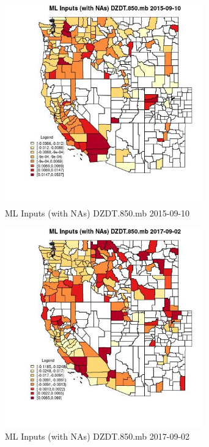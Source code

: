 \begin{figure} 
\centering  
\includegraphics[width=0.77\textwidth]{Code_Outputs/Report_ML_input_PM25_Step4_part_e_de_duplicated_aves_compiled_2019-05-20wNAs_CountyDZDT850mbMean2015-09-10.jpg} 
\caption{\label{fig:Report_ML_input_PM25_Step4_part_e_de_duplicated_aves_compiled_2019-05-20wNAsCountyDZDT850mbMean2015-09-10}ML Inputs (with NAs) DZDT.850.mb 2015-09-10} 
\end{figure} 
 

\begin{figure} 
\centering  
\includegraphics[width=0.77\textwidth]{Code_Outputs/Report_ML_input_PM25_Step4_part_e_de_duplicated_aves_compiled_2019-05-20wNAs_CountyDZDT850mbMean2017-09-02.jpg} 
\caption{\label{fig:Report_ML_input_PM25_Step4_part_e_de_duplicated_aves_compiled_2019-05-20wNAsCountyDZDT850mbMean2017-09-02}ML Inputs (with NAs) DZDT.850.mb 2017-09-02} 
\end{figure} 
 

